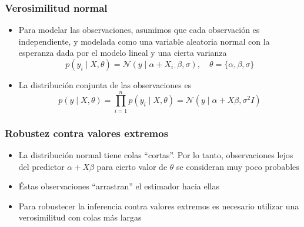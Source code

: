 \documentclass[xcolor=dvipsnames,10pt]{beamer}
\begin{document}
\begin{frame}
  \frametitle{Verosimilitud normal}
  \begin{itemize}
  \item Para modelar las observaciones, asumimos que cada observación es independiente, y modelada como una variable aleatoria normal con la esperanza dada por el modelo lineal y una cierta varianza
    \begin{equation*}
      p(y_i \mid X, \theta) = \mathcal{N}(y \mid \alpha + X_{i \cdot} \beta, \sigma), \quad \theta = \{ \alpha, \beta, \sigma \}
    \end{equation*}
    \begin{figure}
      \centering
    \end{figure}
  \item La distribución conjunta de las observaciones es
    \begin{equation*}
      p(y \mid X, \theta) = \prod^n_{i = 1} p(y_i \mid X, \theta) = \mathcal{N}(y \mid \alpha + X \beta, \sigma^2 I)
    \end{equation*}
  \end{itemize}
\end{frame}
%
\begin{frame}
  \frametitle{Robustez contra valores extremos}
  \begin{itemize}
  \item La distribución normal tiene colas ``cortas''.
    Por lo tanto, observaciones lejos del predictor $\alpha + X \beta$ para cierto valor de $\theta$ se consideran muy poco probables
  \item Éstas observaciones ``arrastran'' el estimador hacia ellas
  \item Para robustecer la inferencia contra valores extremos es necesario utilizar una verosimilitud con colas más largas
  \end{itemize}
\end{frame}
\end{document}
